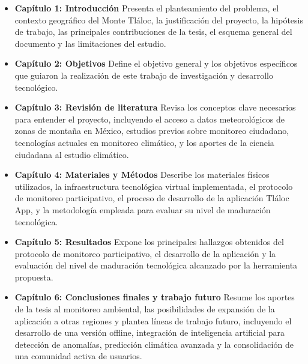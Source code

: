\begin{itemize}
    \item \textbf{Capítulo 1: Introducción} Presenta el planteamiento del problema, el contexto geográfico del Monte Tláloc, la justificación del proyecto, la hipótesis de trabajo, las principales contribuciones de la tesis, el esquema general del documento y las limitaciones del estudio.
    
    \item \textbf{Capítulo 2: Objetivos} Define el objetivo general y los objetivos específicos que guiaron la realización de este trabajo de investigación y desarrollo tecnológico.
    
    \item \textbf{Capítulo 3: Revisión de literatura} Revisa los conceptos clave necesarios para entender el proyecto, incluyendo el acceso a datos meteorológicos de zonas de montaña en México, estudios previos sobre monitoreo ciudadano, tecnologías actuales en monitoreo climático, y los aportes de la ciencia ciudadana al estudio climático.
    
    \item \textbf{Capítulo 4: Materiales y Métodos} Describe los materiales físicos utilizados, la infraestructura tecnológica virtual implementada, el protocolo de monitoreo participativo, el proceso de desarrollo de la aplicación Tláloc App, y la metodología empleada para evaluar su nivel de maduración tecnológica.
    
    \item \textbf{Capítulo 5: Resultados} Expone los principales hallazgos obtenidos del protocolo de monitoreo participativo, el desarrollo de la aplicación y la evaluación del nivel de maduración tecnológica alcanzado por la herramienta propuesta.
    
    \item \textbf{Capítulo 6: Conclusiones finales y trabajo futuro} Resume los aportes de la tesis al monitoreo ambiental, las posibilidades de expansión de la aplicación a otras regiones y plantea líneas de trabajo futuro, incluyendo el desarrollo de una versión offline, integración de inteligencia artificial para detección de anomalías, predicción climática avanzada y la consolidación de una comunidad activa de usuarios.
\end{itemize}



